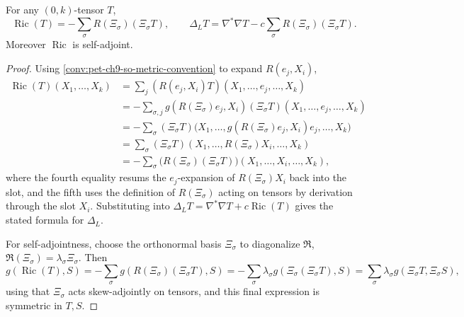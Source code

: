 \begin{lemma}[Lemma 9.3.3]
  \label{lem:pet-ch9-ric-curvature-operator-formula}
  For any $(0,k)$-tensor $T$,
  \[
    \operatorname{Ric}(T)=-\sum_\sigma R(\Xi_\sigma)(\Xi_\sigma T),\qquad
    \Delta_LT=\nabla^*\nabla T-c\sum_\sigma R(\Xi_\sigma)(\Xi_\sigma T).
  \]
  Moreover $\operatorname{Ric}$ is self-adjoint.
\end{lemma}
\begin{proof}
  Using \cref{conv:pet-ch9-so-metric-convention} to expand $R(e_j,X_i)$,
  \begin{align*}
    \operatorname{Ric}(T)(X_1,\dots,X_k)
    &=\sum_j(R(e_j,X_i)T)(X_1,\dots,e_j,\dots,X_k)\\
    &=-\sum_{\sigma,j}g(R(\Xi_\sigma)e_j,X_i)(\Xi_\sigma T)(X_1,\dots,e_j,\dots,X_k)\\
    &=-\sum_\sigma(\Xi_\sigma T)\big(X_1,\dots,g(R(\Xi_\sigma)e_j,X_i)e_j,\dots,X_k\big)\\
    &=\sum_\sigma(\Xi_\sigma T)(X_1,\dots,R(\Xi_\sigma)X_i,\dots,X_k)\\
    &=-\sum_\sigma\big(R(\Xi_\sigma)(\Xi_\sigma T)\big)(X_1,\dots,X_i,\dots,X_k),
  \end{align*}
  where the fourth equality resums the $e_j$-expansion of $R(\Xi_\sigma)X_i$
  back into the slot, and the fifth uses the definition of $R(\Xi_\sigma)$
  acting on tensors by derivation through the slot $X_i$. Substituting into
  $\Delta_LT=\nabla^*\nabla T+c\operatorname{Ric}(T)$ gives the stated formula for
  $\Delta_L$.

  For self-adjointness, choose the orthonormal basis $\Xi_\sigma$ to diagonalize
  $\mathfrak{R}$, $\mathfrak{R}(\Xi_\sigma)=\lambda_\sigma\Xi_\sigma$. Then
  \[
    g(\operatorname{Ric}(T),S)=-\sum_\sigma g(R(\Xi_\sigma)(\Xi_\sigma T),S)
    =-\sum_\sigma\lambda_\sigma g(\Xi_\sigma(\Xi_\sigma T),S)
    =\sum_\sigma\lambda_\sigma g(\Xi_\sigma T,\Xi_\sigma S),
  \]
  using that $\Xi_\sigma$ acts skew-adjointly on tensors, and this final
  expression is symmetric in $T,S$.
\end{proof}

